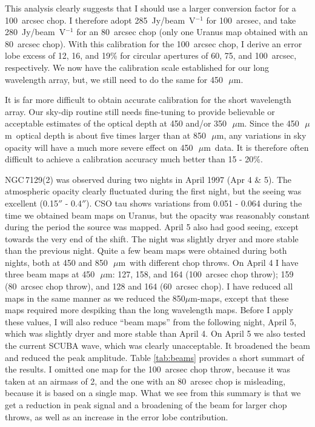 \documentclass[twoside,11pt]{article}
\newcommand{\mic}{\mbox{\,${\mu}$m}}               %
\begin{document}
{This analysis clearly suggests that I should use a larger conversion
factor for a 100~arcsec chop. I  therefore adopt 285~Jy/beam~V$^{-1}$ for 100~arcsec,
and take 280~Jy/beam~V$^{-1}$ for an 80~arcsec chop (only one Uranus map obtained
with an 80~arcsec chop).  With this calibration for the 100~arcsec chop, I derive an
error lobe excess of 12, 16, and 19\%  for circular apertures of 60, 75,
and 100~arcsec, respectively. We now have the calibration scale established for
our long wavelength array, but, we still need to do the same for 450~\mic.

It is far more difficult to obtain accurate calibration for the short
wavelength array. Our sky-dip routine still needs fine-tuning to provide
believable or acceptable estimates of the optical depth at 450 and/or
350~\mic. Since the 450~\mic\ optical depth is about five times larger
than at 850~\mic, any variations in sky opacity will have a much more
severe effect on 450~\mic\ data. It is therefore often difficult to 
achieve a calibration accuracy much better than 15 - 20\%.

NGC\,7129(2) was observed during two nights in April 1997 (Apr 4 \& 5). The
atmospheric opacity clearly fluctuated during the first night, but the seeing
was excellent (0.15$''$ - 0.4$''$).  CSO tau shows variations from 0.051 - 0.064
during the time we obtained beam maps on Uranus, but the opacity was
reasonably constant during the period the source was mapped.  April 5 also had
good seeing, except towards the very end of the shift.  The night was slightly
dryer and more stable than the previous night. Quite a few beam maps were
obtained during both nights, both at 450 and 850~\mic\ with different chop
throws. On April 4 I have three beam maps at 450~\mic: 127, 158, and 164 (100~arcsec
chop throw); 159 (80~arcsec chop throw), and 128 and 164 (60~arcsec chop).  I have reduced
all maps in the same manner as we reduced the 850$\mu$m-maps, except that
these maps required more despiking than the long wavelength maps. Before I
apply these values, I will also reduce ``beam maps'' from the following night,
April 5, which was slightly dryer and more stable than April 4.  On April 5 we
also tested the current SCUBA wave, which was clearly unacceptable. It
broadened the beam and reduced the peak amplitude.  Table \ref{tab:beams}
provides a short summart of the results.  I omitted one map for the 100~arcsec chop
throw, because it was taken at an airmass of 2, and the one with an 80~arcsec chop
is misleading, because it is based on a single map. What we see from this
summary is that we get a reduction in peak signal and a broadening of the beam
for larger chop throws, as well as an increase in the error lobe contribution.

}
\end{document}
